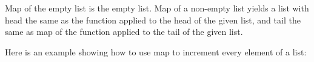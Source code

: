 \begin{fence}
\begin{code}%
\>[0]\AgdaSpace{}%
\AgdaSymbol{:}\AgdaSpace{}%
\AgdaSpace{}%
\AgdaSymbol{\{}\AgdaSpace{}%
\AgdaSpace{}%
\AgdaSymbol{:}\AgdaSpace{}%
\AgdaSymbol{\}}\AgdaSpace{}%
\AgdaSpace{}%
\AgdaSymbol{(}\AgdaSpace{}%
\AgdaSpace{}%
\AgdaSymbol{)}\AgdaSpace{}%
\AgdaSpace{}%
\AgdaSpace{}%
\AgdaSpace{}%
\AgdaSpace{}%
\AgdaSpace{}%
\<%
\\
\>[0]\AgdaSpace{}%
\AgdaSpace{}%
\AgdaInductiveConstructor{[]}%
\>[16]\AgdaSymbol{=}%
\>[19]\AgdaInductiveConstructor{[]}\<%
\\
\>[0]\AgdaSpace{}%
\AgdaSpace{}%
\AgdaSymbol{(}\AgdaSpace{}%
\AgdaSpace{}%
\AgdaSymbol{)}%
\>[16]\AgdaSymbol{=}%
\>[19]\AgdaSpace{}%
\AgdaSpace{}%
\AgdaSpace{}%
\AgdaSpace{}%
\AgdaSpace{}%
\<%
\end{code}
\end{fence}

Map of the empty list is the empty list. Map of a non-empty list yields
a list with head the same as the function applied to the head of the
given list, and tail the same as map of the function applied to the tail
of the given list.

Here is an example showing how to use map to increment every element of
a list:

